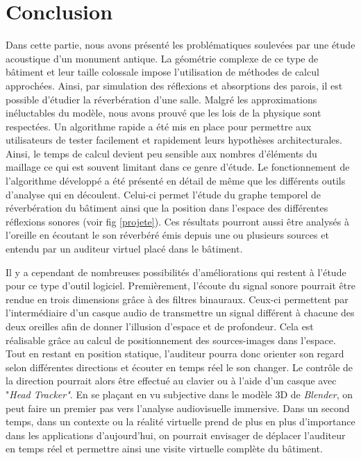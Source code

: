 	
\chapter*{Conclusion}

Dans cette partie, nous avons présenté les problématiques soulevées par une étude acoustique d'un monument antique. La géométrie complexe de ce type de bâtiment et leur taille colossale impose l'utilisation de méthodes de calcul approchées. Ainsi, par simulation des réflexions et absorptions des parois, il est possible d'étudier la réverbération d'une salle. Malgré les approximations inéluctables du modèle, nous avons prouvé que les lois de la physique sont respectées. Un algorithme rapide a été mis en place pour permettre aux utilisateurs de tester facilement et rapidement leurs hypothèses architecturales. Ainsi, le temps de calcul devient peu sensible aux nombres d'éléments du maillage ce qui est souvent limitant dans ce genre d'étude. Le fonctionnement de l'algorithme développé a été présenté en détail de même que les différents outils d'analyse qui en découlent. Celui-ci permet l'étude du graphe temporel de réverbération du bâtiment ainsi que la position dans l'espace des différentes réflexions sonores (voir fig \ref{projete}). Ces résultats pourront aussi être analysés à l'oreille en écoutant le son réverbéré émis depuis une ou plusieurs sources et entendu par un auditeur virtuel placé dans le bâtiment. %
%
%


Il y a cependant de nombreuses possibilités d'améliorations qui restent à l'étude pour ce type d'outil logiciel. Premièrement, l'écoute du signal sonore pourrait être rendue en trois dimensions grâce à des filtres binauraux. Ceux-ci permettent par l'intermédiaire d'un casque audio de transmettre un signal différent à chacune des deux oreilles afin de donner l'illusion d'espace et de profondeur. Cela est réalisable grâce au calcul de positionnement des sources-images dans l'espace. Tout en restant en position statique, l'auditeur pourra donc orienter son regard selon différentes directions et écouter en temps réel le son changer. Le contrôle de la direction pourrait alors être effectué au clavier ou à l'aide d'un casque avec "\textit{Head Tracker"}. En se plaçant en vu subjective dans le modèle 3D de \textit{Blender}, on peut faire un premier pas vers l'analyse audiovisuelle immersive. Dans un second temps, dans un contexte ou la réalité virtuelle prend de plus en plus d'importance dans les applications d'aujourd'hui, on pourrait envisager de déplacer l'auditeur en temps réel et permettre ainsi une visite virtuelle complète du bâtiment.

